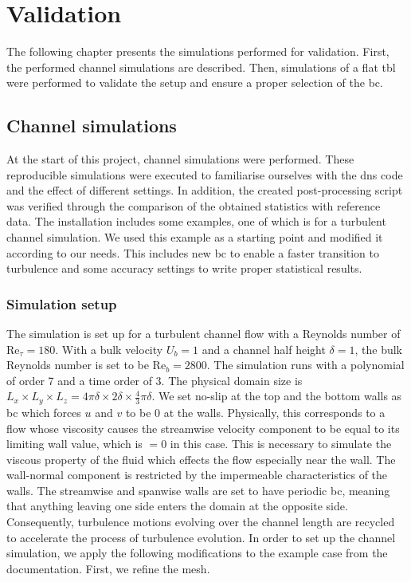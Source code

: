 \chapter{Validation} \label{chap:validation}


The following chapter presents the simulations performed for validation.
First, the performed channel simulations are described.
Then, simulations of a flat \acrshort{tbl} were performed to validate the setup and ensure a proper selection of the \acrshort{bc}.

\section{Channel simulations}\label{sec:channel}
At the start of this project, channel simulations were performed. 
These reproducible simulations were executed to familiarise ourselves with the \acrshort{dns} code and the effect of different settings. 
In addition, the created post-processing script was verified through the comparison of the obtained statistics with reference data.
The  installation includes some examples, one of which is for a turbulent channel simulation.
We used this example as a starting point and modified it according to our needs.
This includes new \acrshort{bc} to enable a faster transition to turbulence and some accuracy settings to write proper statistical results.

\subsection{Simulation setup} \label{subsec:channelSetup}

The simulation is set up for a turbulent channel flow with a Reynolds number of $\mathrm{Re}_\tau = 180$.
With a bulk velocity $U_b = 1$ and a channel half height $\delta = 1$, the bulk Reynolds number is set to be $\mathrm{Re}_b = 2800$.
The simulation runs with a polynomial of order 7 and a time order of 3.
The physical domain size is $ L_x \times L_y \times L_z = 4\pi \delta \times 2 \delta \times \frac{4}{3}\pi \delta$.
We set no-slip at the top and the bottom walls as \acrshort{bc} which forces $u$ and $v$ to be 0 at the walls.
Physically, this corresponds to a flow whose viscosity causes the streamwise velocity component to be equal to its limiting wall value, which is $=0$ in this case.
This is necessary to simulate the viscous property of the fluid which effects the flow especially near the wall.
The wall-normal component is restricted by the impermeable characteristics of the walls.
The streamwise and spanwise walls are set to have periodic \acrlong{bc}, meaning that anything leaving one side enters the domain at the opposite side.
Consequently, turbulence motions evolving over the channel length are recycled to accelerate the process of turbulence evolution.
In order to set up the channel simulation, we apply the following modifications to the example case from the  documentation.
First, we refine the mesh.


